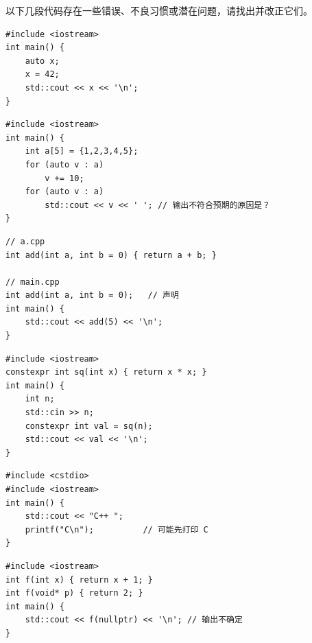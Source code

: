 \begin{exercise}[改错]    
    以下几段代码存在一些错误、不良习惯或潜在问题，请找出并改正它们。
\begin{verbatim}
#include <iostream>
int main() {
    auto x;              
    x = 42;
    std::cout << x << '\n';
}
\end{verbatim}

\begin{verbatim}
#include <iostream>
int main() {
    int a[5] = {1,2,3,4,5};
    for (auto v : a)          
        v += 10;
    for (auto v : a)
        std::cout << v << ' '; // 输出不符合预期的原因是？
}
\end{verbatim}

\begin{verbatim}
// a.cpp
int add(int a, int b = 0) { return a + b; }

// main.cpp
int add(int a, int b = 0);   // 声明
int main() {
    std::cout << add(5) << '\n';
}
\end{verbatim}

\begin{verbatim}
#include <iostream>
constexpr int sq(int x) { return x * x; }
int main() {
    int n;
    std::cin >> n;
    constexpr int val = sq(n);
    std::cout << val << '\n';
}
\end{verbatim}

\begin{verbatim}
#include <cstdio>
#include <iostream>
int main() {
    std::cout << "C++ ";
    printf("C\n");          // 可能先打印 C
}
\end{verbatim}

\begin{verbatim}
#include <iostream>
int f(int x) { return x + 1; }
int f(void* p) { return 2; }
int main() {
    std::cout << f(nullptr) << '\n'; // 输出不确定
}
\end{verbatim}

\end{exercise}


